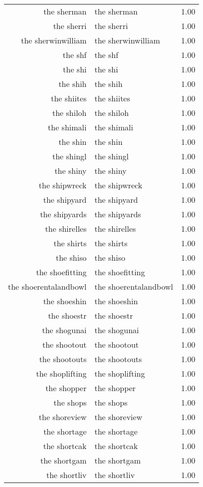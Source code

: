 \begin{table}[ht]
\begin{tabular}{rlr}
  the sherman & the sherman & 1.00 \\ 
  the sherri & the sherri & 1.00 \\ 
  the sherwinwilliam & the sherwinwilliam & 1.00 \\ 
  the shf & the shf & 1.00 \\ 
  the shi & the shi & 1.00 \\ 
  the shih & the shih & 1.00 \\ 
  the shiites & the shiites & 1.00 \\ 
  the shiloh & the shiloh & 1.00 \\ 
  the shimali & the shimali & 1.00 \\ 
  the shin & the shin & 1.00 \\ 
  the shingl & the shingl & 1.00 \\ 
  the shiny & the shiny & 1.00 \\ 
  the shipwreck & the shipwreck & 1.00 \\ 
  the shipyard & the shipyard & 1.00 \\ 
  the shipyards & the shipyards & 1.00 \\ 
  the shirelles & the shirelles & 1.00 \\ 
  the shirts & the shirts & 1.00 \\ 
  the shiso & the shiso & 1.00 \\ 
  the shoefitting & the shoefitting & 1.00 \\ 
  the shoerentalandbowl & the shoerentalandbowl & 1.00 \\ 
  the shoeshin & the shoeshin & 1.00 \\ 
  the shoestr & the shoestr & 1.00 \\ 
  the shogunai & the shogunai & 1.00 \\ 
  the shootout & the shootout & 1.00 \\ 
  the shootouts & the shootouts & 1.00 \\ 
  the shoplifting & the shoplifting & 1.00 \\ 
  the shopper & the shopper & 1.00 \\ 
  the shops & the shops & 1.00 \\ 
  the shoreview & the shoreview & 1.00 \\ 
  the shortage & the shortage & 1.00 \\ 
  the shortcak & the shortcak & 1.00 \\ 
  the shortgam & the shortgam & 1.00 \\ 
  the shortliv & the shortliv & 1.00 \\ 

\end{tabular}
\end{table}
